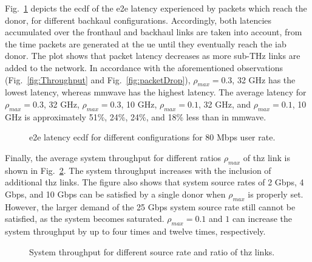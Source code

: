 Fig.~\ref{fig:Latency} depicts the \gls{ecdf} of the \gls{e2e} latency experienced by packets which reach the donor, for different bachkaul configurations. Accordingly, both latencies accumulated over the fronthaul and backhaul links are taken into account, from the time packets are generated at the \gls{ue} until they eventually reach the \gls{iab} donor. The plot shows that packet latency decreases as more sub-THz links are added to the network. In accordance with the aforementioned observations (Fig.~\ref{fig:Throughput} and Fig.~\ref{fig:packetDrop}), $\rho_{max} = 0.3$, 32 GHz has the lowest latency, whereas \gls{mmwave} has the highest latency. The average latency for $\rho_{max} = 0.3$, 32 GHz, $\rho_{max} = 0.3$, 10 GHz, $\rho_{max} = 0.1$, 32 GHz, and $\rho_{max} = 0.1$, 10 GHz is approximately 51\%, 24\%, 24\%, and 18\% less than in \gls{mmwave}.

\begin{figure}[t!]
    \centering
    \setlength{}
    \setlength{}
    
    \caption{\Gls{e2e} latency \gls{ecdf} for different configurations for 80 Mbps user rate.}
    \label{fig:Latency}
\end{figure}

Finally, the average system throughput for different ratios $\rho_{max}$ of \gls{thz} link is shown in Fig.~\ref{fig:THZtotal}.
The system throughput increases with the inclusion of additional \gls{thz} links. 
The figure also shows that system source rates of 2 Gbps, 4 Gbps, and 10 Gbps can be satisfied by a single donor when $\rho_{max}$ is properly set.
%
However, the larger demand of the 25 Gbps system source rate still cannot be satisfied, as the system becomes saturated.
$\rho_{max} = 0.1$ and $1$ can increase the system throughput by up to four times and twelve times, respectively.

\begin{figure}[t!]
    \centering
    \setlength{}
    \setlength{}
    
    \caption{System throughput for different source rate and ratio of \gls{thz} links.}
    \label{fig:THZtotal}
\end{figure}


